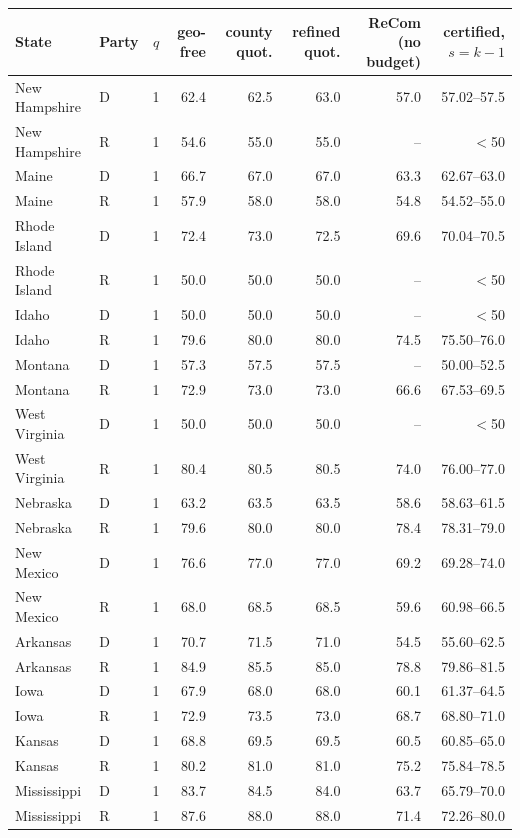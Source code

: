 \begin{tabular}{llcrrrrr}
\toprule
State & Party & $q$ & geo-free & county quot. & refined quot. & ReCom (no budget) & certified, $s{=}k{-}1$ \\
\midrule
New Hampshire & D & 1 & 62.4 & 62.5 & 63.0 & 57.0 & 57.02--57.5 \\
New Hampshire & R & 1 & 54.6 & 55.0 & 55.0 & -- & $<$50 \\
Maine & D & 1 & 66.7 & 67.0 & 67.0 & 63.3 & 62.67--63.0 \\
Maine & R & 1 & 57.9 & 58.0 & 58.0 & 54.8 & 54.52--55.0 \\
Rhode Island & D & 1 & 72.4 & 73.0 & 72.5 & 69.6 & 70.04--70.5 \\
Rhode Island & R & 1 & 50.0 & 50.0 & 50.0 & -- & $<$50 \\
Idaho & D & 1 & 50.0 & 50.0 & 50.0 & -- & $<$50 \\
Idaho & R & 1 & 79.6 & 80.0 & 80.0 & 74.5 & 75.50--76.0 \\
Montana & D & 1 & 57.3 & 57.5 & 57.5 & -- & 50.00--52.5 \\
Montana & R & 1 & 72.9 & 73.0 & 73.0 & 66.6 & 67.53--69.5 \\
West Virginia & D & 1 & 50.0 & 50.0 & 50.0 & -- & $<$50 \\
West Virginia & R & 1 & 80.4 & 80.5 & 80.5 & 74.0 & 76.00--77.0 \\
Nebraska & D & 1 & 63.2 & 63.5 & 63.5 & 58.6 & 58.63--61.5 \\
Nebraska & R & 1 & 79.6 & 80.0 & 80.0 & 78.4 & 78.31--79.0 \\
New Mexico & D & 1 & 76.6 & 77.0 & 77.0 & 69.2 & 69.28--74.0 \\
New Mexico & R & 1 & 68.0 & 68.5 & 68.5 & 59.6 & 60.98--66.5 \\
Arkansas & D & 1 & 70.7 & 71.5 & 71.0 & 54.5 & 55.60--62.5 \\
Arkansas & R & 1 & 84.9 & 85.5 & 85.0 & 78.8 & 79.86--81.5 \\
Iowa & D & 1 & 67.9 & 68.0 & 68.0 & 60.1 & 61.37--64.5 \\
Iowa & R & 1 & 72.9 & 73.5 & 73.0 & 68.7 & 68.80--71.0 \\
Kansas & D & 1 & 68.8 & 69.5 & 69.5 & 60.5 & 60.85--65.0 \\
Kansas & R & 1 & 80.2 & 81.0 & 81.0 & 75.2 & 75.84--78.5 \\
Mississippi & D & 1 & 83.7 & 84.5 & 84.0 & 63.7 & 65.79--70.0 \\
Mississippi & R & 1 & 87.6 & 88.0 & 88.0 & 71.4 & 72.26--80.0 \\

\end{tabular}
